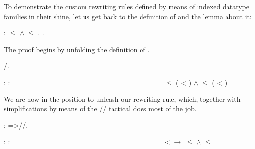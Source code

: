 To demonstrate the custom rewriting rules defined by means of indexed
datatype families in their shine, let us get back to the definition
of  and the lemma about it:


\begin{coqdoccode}
\coqdocemptyline
\coqdocnoindent
{}   :  \ensuremath{\le}    \ensuremath{\land}  \ensuremath{\le}   .\coqdoceol
\coqdocnoindent
{}.\coqdoceol
\end{coqdoccode}


The proof begins by unfolding the definition of .


\begin{coqdoccode}
\coqdocnoindent
{} /.\coqdoceol
\coqdocemptyline
\end{coqdoccode}


\coqdoceol
\coqdocemptyline
\coqdocindent{1.00em}
 : \coqdoceol
\coqdocindent{1.00em}
 : \coqdoceol
\coqdocindent{1.00em}
============================\coqdoceol
\coqdocindent{1.50em}
 \ensuremath{\le} (  <     ) \ensuremath{\land}  \ensuremath{\le} (  <     )

\coqdocemptyline


We are now in the position to unleash our rewriting rule, which,
together with simplifications by means of the // tactical
\ssrtl{//} does most of the job.


\begin{coqdoccode}
\coqdocemptyline
\coqdocnoindent
{}: =>//.\coqdoceol
\coqdocemptyline
\end{coqdoccode}


\coqdoceol
\coqdocemptyline
\coqdocindent{1.00em}
 : \coqdoceol
\coqdocindent{1.00em}
 : \coqdoceol
\coqdocindent{1.00em}
============================\coqdoceol
\coqdocindent{1.50em}
 <  \ensuremath{\rightarrow}  \ensuremath{\le}  \ensuremath{\land}  \ensuremath{\le} 

